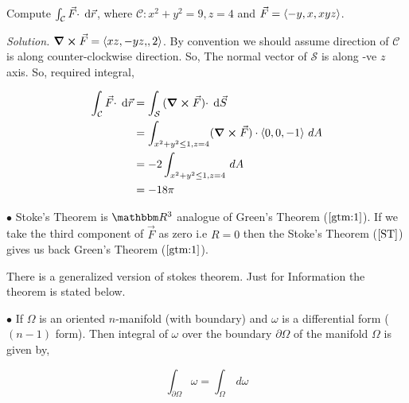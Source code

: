 \documentclass[Analysis-3]{subfiles}
\begin{document}
\begin{Eg}{}{}
    Compute $\int_{\mathcal{C}} {\vec{F} \cdot } \hspace{0.1cm} \dd {\vec{r}}$, where $\mathcal{C} : x^2 +y^2 = 9 , z =4$ and $\vec{F} = \left\langle {-y,x}, {xyz} \right\rangle$.

    \textit{Solution.} $\curl \vec{F} = \left\langle {xz,-yz,}, {2} \right\rangle$. By convention we should assume direction of $\mathcal{C}$ is along counter-clockwise direction. So,  The normal vector of $\mathcal{S}$ is along -ve $z$ axis. So, required integral,

\begin{align*}
    \int_{\mathcal{C}} {\vec{F} \cdot } \hspace{0.1cm} \dd {\vec{r}} &= \int_{\mathcal{S}} {(\curl \vec{F}) \cdot} \hspace{0.1cm} \dd {\vec{S}}  \\
    &= \int_{x^2+y^2 \le 1 , z =4 } (\curl \vec{F}) \cdot \left\langle {0,0}, {-1} \right\rangle \,dA \\
    &= -2 \int_{x^2+y^2 \le 1 , z =4} \,dA \\
    &= -18\pi
\end{align*}

\end{Eg}


$\bullet$ Stoke's Theorem is $\R^3$ analogue of Green's Theorem ($\ref{gtm:1}$). If we take the third component of $\vec{F}$ as zero i.e $R =0$ then the Stoke's Theorem ($\ref{ST}$) gives us back Green's Theorem ($\ref{gtm:1}$).

\begin{tcolorbox}
    There is a generalized version of stokes theorem. Just for Information the theorem is stated below.

    $\bullet$ If $\Omega$ is an oriented $n$-manifold (with boundary) and $\omega$ is a differential form ($(n-1)$ form). Then integral of $\omega$ over the boundary $\partial \Omega$ of the manifold $\Omega$ is given by, 

    \[\int_{\partial \Omega} \omega = \int_{\Omega} \,d \omega\]

\end{tcolorbox}
\end{document}
